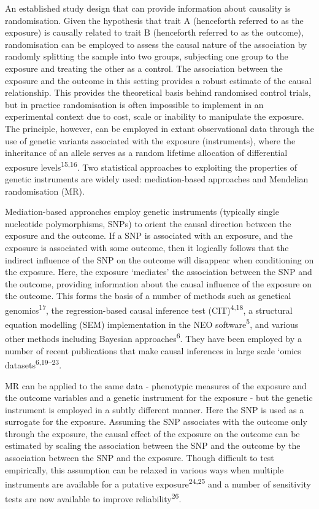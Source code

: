 \documentclass[]{article}
\begin{document}
An established study design that can provide information about causality
is randomisation. Given the hypothesis that trait A (henceforth referred
to as the exposure) is causally related to trait B (henceforth referred
to as the outcome), randomisation can be employed to assess the causal
nature of the association by randomly splitting the sample into two
groups, subjecting one group to the exposure and treating the other as a
control. The association between the exposure and the outcome in this
setting provides a robust estimate of the causal relationship. This
provides the theoretical basis behind randomised control trials, but in
practice randomisation is often impossible to implement in an
experimental context due to cost, scale or inability to manipulate the
exposure. The principle, however, can be employed in extant
observational data through the use of genetic variants associated with
the exposure (instruments), where the inheritance of an allele serves as
a random lifetime allocation of differential exposure
levels\textsuperscript{15,16}. Two statistical approaches to exploiting
the properties of genetic instruments are widely used: mediation-based
approaches and Mendelian randomisation (MR).

Mediation-based approaches employ genetic instruments (typically single
nucleotide polymorphisms, SNPs) to orient the causal direction between
the exposure and the outcome. If a SNP is associated with an exposure,
and the exposure is associated with some outcome, then it logically
follows that the indirect influence of the SNP on the outcome will
disappear when conditioning on the exposure. Here, the exposure
`mediates' the association between the SNP and the outcome, providing
information about the causal influence of the exposure on the outcome.
This forms the basis of a number of methods such as genetical
genomics\textsuperscript{17}, the regression-based causal inference test
(CIT)\textsuperscript{4,18}, a structural equation modelling (SEM)
implementation in the NEO software\textsuperscript{5}, and various other
methods including Bayesian approaches\textsuperscript{6}. They have been
employed by a number of recent publications that make causal inferences
in large scale `omics datasets\textsuperscript{6,19--23}.

MR can be applied to the same data - phenotypic measures of the exposure
and the outcome variables and a genetic instrument for the exposure -
but the genetic instrument is employed in a subtly different manner.
Here the SNP is used as a surrogate for the exposure. Assuming the SNP
associates with the outcome only through the exposure, the causal effect
of the exposure on the outcome can be estimated by scaling the
association between the SNP and the outcome by the association between
the SNP and the exposure. Though difficult to test empirically, this
assumption can be relaxed in various ways when multiple instruments are
available for a putative exposure\textsuperscript{24,25} and a number of
sensitivity tests are now available to improve
reliability\textsuperscript{26}.
\end{document}
